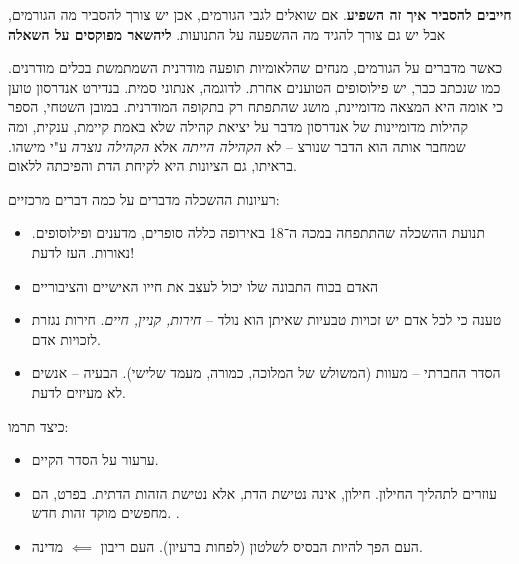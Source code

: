 \documentclass[]{article}
\begin{document}
	\textbf{חייבים להסביר איך זה השפיע}. אם שואלים לגבי הגורמים, אכן יש צורך להסביר מה הגורמים, אבל יש גם צורך להגיד מה ההשפעה על התנועות. 
	\textbf{ליהשאר מפוקסים על השאלה}
	
	
	כאשר מדברים על הגורמים, מנחים שהלאומיות תופעה מודרנית השמתמשת בכלים מודרנים. כמו שנכתב כבר, יש פילוסופים הטוענים אחרת. לדוגמה, אנתוני סמית. בנדירט אנדרסון טוען כי אומה היא המצאה מדומיינת, מושג שהתפתח רק בתקופה המודרנית. במובן השטחי, הספר קהילות מדומיינות של אנדרסון מדבר על יציאת קהילה שלא באמת קיימת, ענקית, ומה שמחבר אותה הוא הדבר שנורצ – לא \textit{הקהילה הייתה} אלא \textit{הקהילה נוצרה} ע"י מישהו. בראיתו, גם הציונות היא לקיחת הדת והפיכתה ללאום. 
	
	רעיונות ההשכלה מדברים על כמה דברים מרכזיים: 
	\begin{itemize}
		\item תנועת ההשכלה שהתתפחה במכה ה־18 באירופה כללה סופרים, מדענים ופילוסופים. נאורות. העז לדעת!
		\item האדם בכוח התבונה שלו יכול לעצב את חייו האישיים והציבוריים
		\item טענה כי לכל אדם יש זכויות טבעיות שאיתן הוא נולד – \textit{חירות, קניין, חיים}. חירות נגזרת לזכויות אדם. 
		\item הסדר החברתי – מעוות (המשולש של המלוכה, כמורה, מעמד שלישי). הבעיה – אנשים לא מעיזים לדעת. 
	\end{itemize}
	
	כיצד תרמו: 
	\begin{itemize}
		\item ערעור על הסדר הקיים. 
		\item עוזרים לתהליך החילון. חילון, אינה נטישת הדת, אלא נטישת הזהות הדתית. בפרט, הם מחפשים מוקד זהות חדש. . 
		\item העם הפך להיות הבסיס לשלטון (לפחות ברעיון). העם ריבון $\impliedby$ מדינה.
	\end{itemize}
	
\end{document}
